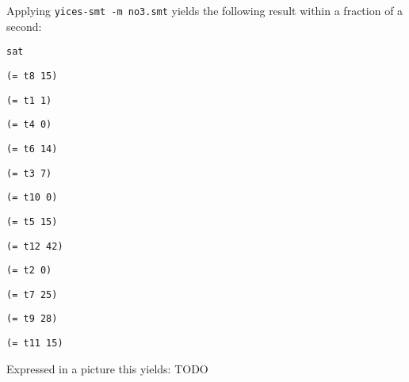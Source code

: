 \documentclass[12pt]{article}
\begin{document}
Applying {\tt yices-smt -m no3.smt} yields the following result
within a fraction of a second: 

{\footnotesize
{\tt sat }

{\tt  }

{\tt (= t8 15) }

{\tt (= t1 1) }

{\tt (= t4 0) }

{\tt (= t6 14) }

{\tt (= t3 7) }

{\tt (= t10 0) }

{\tt (= t5 15) }

{\tt (= t12 42) }

{\tt (= t2 0) }

{\tt (= t7 25) }

{\tt (= t9 28) }

{\tt (= t11 15) }

{\tt  }
}
Expressed in a picture this yields: TODO
\end{document}
